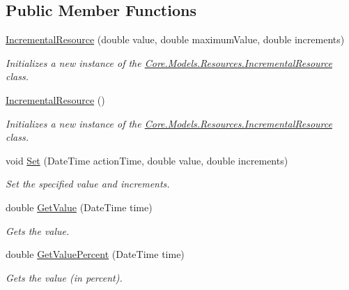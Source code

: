 \subsection*{Public Member Functions}
\begin{DoxyCompactItemize}
\item 
\hyperlink{classCore_1_1Models_1_1Resources_1_1IncrementalResource_a0531e13b786b186772f59c3e126fa3b8}{Incremental\+Resource} (double value, double maximum\+Value, double increments)
\begin{DoxyCompactList}\small\item\em Initializes a new instance of the \hyperlink{classCore_1_1Models_1_1Resources_1_1IncrementalResource}{Core.\+Models.\+Resources.\+Incremental\+Resource} class. \end{DoxyCompactList}\item 
\hyperlink{classCore_1_1Models_1_1Resources_1_1IncrementalResource_aabdd81d259b9979eea4427da9508e085}{Incremental\+Resource} ()
\begin{DoxyCompactList}\small\item\em Initializes a new instance of the \hyperlink{classCore_1_1Models_1_1Resources_1_1IncrementalResource}{Core.\+Models.\+Resources.\+Incremental\+Resource} class. \end{DoxyCompactList}\item 
void \hyperlink{classCore_1_1Models_1_1Resources_1_1IncrementalResource_a4c95456760a889b5bf6ca1bffbb4735d}{Set} (Date\+Time action\+Time, double value, double increments)
\begin{DoxyCompactList}\small\item\em Set the specified value and increments. \end{DoxyCompactList}\item 
double \hyperlink{classCore_1_1Models_1_1Resources_1_1IncrementalResource_af2eb0a0b5b7d935b313ffcf9f52624c4}{Get\+Value} (Date\+Time time)
\begin{DoxyCompactList}\small\item\em Gets the value. \end{DoxyCompactList}\item 
double \hyperlink{classCore_1_1Models_1_1Resources_1_1IncrementalResource_a02460d847f9be7b26a302a020e649bca}{Get\+Value\+Percent} (Date\+Time time)
\begin{DoxyCompactList}\small\item\em Gets the value (in percent). \end{DoxyCompactList}\end{DoxyCompactItemize}
